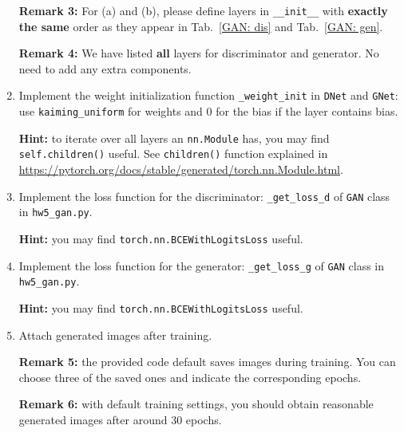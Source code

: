 \begin{Q}
\begin{enumerate}
	\textbf{Remark 3:} For (a) and (b), please define layers in \texttt{\_\_init\_\_} with \textbf{exactly the same} order as they appear in Tab.~\ref{GAN: dis} and Tab.~\ref{GAN: gen}.
	
	\textbf{Remark 4:} We have listed \textbf{all} layers for discriminator and generator. No need to add any extra components.
	
	\item Implement the weight initialization function \texttt{\_weight\_init} in \texttt{DNet} and \texttt{GNet}: use \texttt{kaiming\_uniform} for weights and 0 for the bias if the layer contains bias.
	
	\textbf{Hint:} to iterate over all layers an \texttt{nn.Module} has, you may find \texttt{self.children()} useful. See \texttt{children()} function explained in  \url{https://pytorch.org/docs/stable/generated/torch.nn.Module.html}.
	
	\item Implement the loss function for the discriminator: \texttt{\_get\_loss\_d} of \texttt{GAN} class in \texttt{hw5\_gan.py}.
	
	\textbf{Hint:} you may find \texttt{torch.nn.BCEWithLogitsLoss} useful.

	\item Implement the loss function for the generator: \texttt{\_get\_loss\_g} of \texttt{GAN} class in \texttt{hw5\_gan.py}.
	
	\textbf{Hint:} you may find \texttt{torch.nn.BCEWithLogitsLoss} useful.

	\item Attach generated images after training.
	
	\textbf{Remark 5:} the provided code default saves images during training. You can choose three of the saved ones and indicate the corresponding epochs.
	
	\textbf{Remark 6:} with default training settings, you should obtain reasonable generated images after around 30 epochs.
	
\end{enumerate}

\end{Q}
          

            